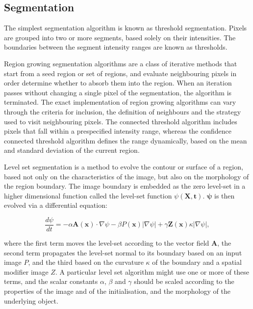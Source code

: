   \subsection{Segmentation} %
  \label{sub:segmentation}
    The simplest segmentation algorithm is known as threshold segmentation. Pixels are grouped into two or more segments, based solely on their intensities. The boundaries between the segment intensity ranges are known as thresholds. 
    
    Region growing segmentation algorithms are a class of iterative methods that start from a seed region or set of regions, and evaluate neighbouring pixels in order determine whether to absorb them into the region. When an iteration passes without changing a single pixel of the segmentation, the algorithm is terminated. The exact implementation of region growing algorithms can vary through the criteria for inclusion, the definition of neighbours and the strategy used to visit neighbouring pixels. The connected threshold algorithm includes pixels that fall within a prespecified intensity range, whereas the confidence connected threshold algorithm defines the range dynamically, based on the mean and standard deviation of the current region. 
    
    Level set segmentation is a method to evolve the contour or surface of a region, based not only on the characteristics of the image, but also on the morphology of the region boundary. The image boundary is embedded as the zero level-set in a higher dimensional function called the level-set function $\psi(\mathbf{X}, \mathbf{t})$. $\mathbf{\psi}$ is then evolved via a differential equation:
    
    \begin{equation}
      \frac{d\psi}{dt} = -\alpha\mathbf{A}(\mathbf{x}) \cdot \nabla \psi - \beta P(\mathbf{x})|\nabla\psi| + \gamma\mathbf{Z}(\mathbf{x})\kappa|\nabla\psi|,
    \end{equation}
    
    where the first term moves the level-set according to the vector field \textbf{A}, the second term propagates the level-set normal to its boundary based on an input image $P$, and the third based on the curvature $\kappa$ of the boundary and a spatial modifier image $Z$. A particular level set algorithm might use one or more of these terms, and the scalar constants $\alpha$, $\beta$ and $\gamma$ should be scaled according to the properties of the image and of the initialisation, and the morphology of the underlying object.
    
